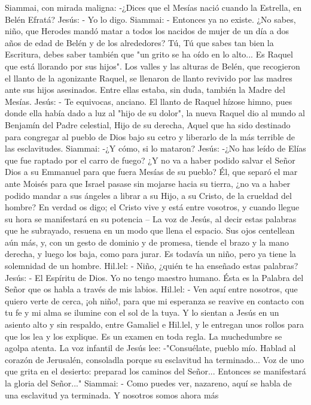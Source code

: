 \documentclass[12pt]{book} %
\begin{document}
Siammai, con mirada maligna: 
-¿Dices que el Mesías nació cuando la Estrella, en Belén Efratá? Jesús: - Yo lo digo. 
Siammai: - Entonces ya no existe. ¿No sabes, niño, que Herodes mandó matar a todos los nacidos de mujer de un día a 
dos años de edad de Belén y de los alrededores? Tú, Tú que sabes tan bien la Escritura, debes saber también que "un grito se ha oído en lo alto... Es Raquel que está llorando por sus hijos". Los valles y las alturas de Belén, que recogieron el llanto de la agonizante Raquel, se llenaron de llanto revivido por las madres ante sus hijos asesinados. Entre ellas estaba, sin duda, también la Madre del Mesías. 
Jesús: - Te equivocas, anciano. El llanto de Raquel hízose himno, pues donde ella había dado a luz al "hijo de su dolor", 
la nueva Raquel dio al mundo al Benjamín del Padre celestial, Hijo de su derecha, Aquel que ha sido destinado para congregar al pueblo de Dios bajo su cetro y liberarlo de la más terrible de las esclavitudes. 
Siammai: -¿Y cómo, si lo mataron? 
Jesús: -¿No has leído de Elías que fue raptado por el carro de fuego? ¿Y no va a haber podido salvar el Señor Dios a su Emmanuel para que fuera Mesías de su pueblo? Él, que separó el mar ante Moisés para que Israel pasase sin mojarse hacia su tierra, ¿no va a haber podido mandar a sus ángeles a librar a su Hijo, a su Cristo, de la crueldad del hombre? En verdad os digo; el Cristo vive y está entre vosotros, y cuando llegue su hora se manifestará en su potencia – La voz de Jesús, al decir estas palabras que he subrayado, resuena en un modo que llena el espacio. Sus ojos centellean aún más, y, con un gesto de dominio y de promesa, tiende el brazo y la mano derecha, y luego los baja, como para jurar. Es todavía un niño, pero ya tiene la solemnidad de un hombre. 
Hil.lel: - Niño, ¿quién te ha enseñado estas palabras? 
Jesús: - El Espíritu de Dios. Yo no tengo maestro humano. Ésta es la Palabra del Señor que os habla a través de mis 
labios. 
Hil.lel: - Ven aquí entre nosotros, que quiero verte de cerca, ¡oh niño!, para que mi esperanza se reavive en contacto 
con tu fe y mi alma se ilumine con el sol de la tuya. 
Y lo sientan a Jesús en un asiento alto y sin respaldo, entre Gamaliel e Hil.lel, y le entregan unos rollos para que los lea y los explique. Es un examen en toda regla. La muchedumbre se agolpa atenta. 
La voz infantil de Jesús lee: -"Consuélate, pueblo mío. Hablad al corazón de Jerusalén, consoladla porque su esclavitud ha terminado... Voz de uno que grita en el desierto: preparad los caminos del Señor... Entonces se manifestará la gloria del 
Señor..." 
Siammai: - Como puedes ver, nazareno, aquí se habla de una esclavitud ya terminada. Y nosotros somos ahora más 
\end{document}
